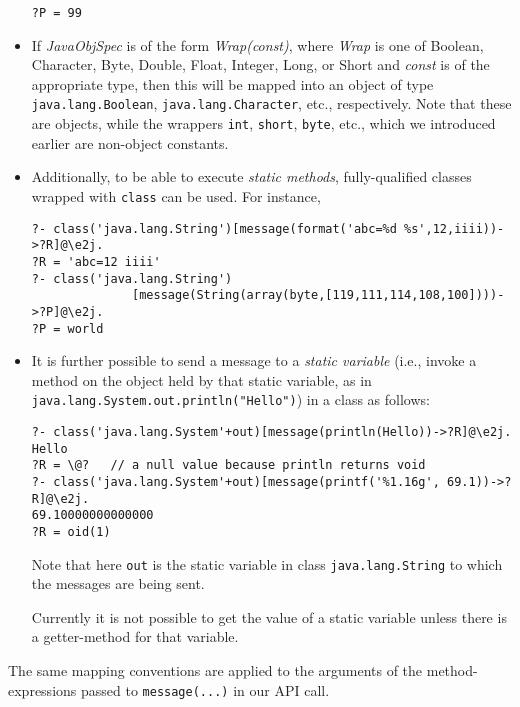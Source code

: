 \begin{itemize}
\begin{verbatim}
?P = 99
\end{verbatim}
\item If \emph{JavaObjSpec} is of the form \emph{Wrap(const)}, where
  \emph{Wrap} is one of Boolean, Character, Byte, Double, Float,
  Integer, Long, or Short and \emph{const} is of the appropriate \ERGO
  type, then this will be mapped into an object of type
  \texttt{java.lang.Boolean}, \texttt{java.lang.Character}, etc., respectively.
  Note that these are objects, while the wrappers \texttt{int},
  \texttt{short}, \texttt{byte}, etc., which we introduced earlier   
  are non-object constants.
\item Additionally, to be able to execute \emph{static methods}, fully-qualified
  classes wrapped with \texttt{class} can be used. For instance,
\begin{verbatim}
?- class('java.lang.String')[message(format('abc=%d %s',12,iiii))->?R]@\e2j.
?R = 'abc=12 iiii'
?- class('java.lang.String')
              [message(String(array(byte,[119,111,114,108,100])))->?P]@\e2j.
?P = world
\end{verbatim}
  \item It is further possible to send a message to a \emph{static variable}
    (i.e., invoke a method on the object held by that static variable, as
    in \texttt{java.lang.System.out.println("Hello")}) 
    in a class as follows:
\begin{verbatim}
?- class('java.lang.System'+out)[message(println(Hello))->?R]@\e2j.
Hello
?R = \@?   // a null value because println returns void
?- class('java.lang.System'+out)[message(printf('%1.16g', 69.1))->?R]@\e2j.
69.10000000000000
?R = oid(1)    
\end{verbatim}
    Note that here \texttt{out} is the static variable in class
    \texttt{java.lang.String} to which the messages are being sent.  

    Currently it is not possible to get the value of a static variable
    unless there is a getter-method for that variable.
\end{itemize}
The same mapping conventions are applied to the arguments of the
method-expressions passed to \texttt{message(...)} in our API call. 



